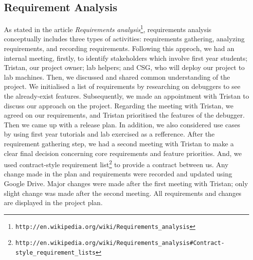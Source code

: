 \documentclass[11pt]{article}
\begin{document}
\subsection{Requirement Analysis}
As stated in the article \textit{Requirements analysis}\footnote{\tt{http://en.wikipedia.org/wiki/Requirements\_analysis}}, requirements analysis conceptually includes three types of activities: requirements gathering, analyzing requirements, and recording requirements.
Following this approch, we had an internal meeting, firstly, to identify stakeholders which involve first year students; Tristan, our project owner; lab helpers; and CSG, who will deploy our project to lab machines. Then, we discussed and shared common understanding of the project. We initialised a list of requirements by researching on debuggers to see the already-exist features. Subsequently, we made an appointment with Tristan to discuss our approach on the project. Regarding the meeting with Tristan, we agreed on our requirements, and Tristan prioritised the features of the debugger. Then we came up with a release plan. In addition, we also considered use cases by using first year tutorials and lab exercised as a refference. After the requirement gathering step, we had a second meeting with Tristan to make a clear final decision concerning core requirements and feature priorities. And, we used contract-style requirement list\footnote{\tt{http://en.wikipedia.org/wiki/Requirements\_analysis\#Contract-style\_requirement\_lists}} to provide a contract between us.
Any change made in the plan and requirements were recorded and updated using Google Drive. Major changes were made after the first meeting with Tristan; only slight change was made after the second meeting.
All requirements and changes are displayed in the project plan.
\end{document}
